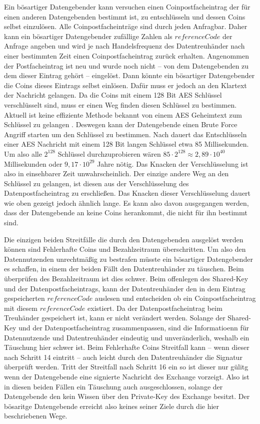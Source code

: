 \documentclass[
	fontsize=12pt,
	headings=small,
	parskip=half,           %
	bibliography=totoc,
	numbers=noenddot,       %
	open=any,               %
]{scrreprt}
\begin{document}
Ein bösartiger Datengebender kann versuchen einen Coinpostfacheintrag der für einen anderen Datengebenden bestimmt ist, zu entschlüsseln und dessen Coins selbst einzulösen. Alle Coinpostfacheinträge sind durch jeden Anfragbar. Daher kann ein bösartiger Datengebender zufällige Zahlen als $referenceCode$ der Anfrage angeben und wird je nach Handelsfrequenz des Datentreuhänder nach einer bestimmten Zeit einen Coinpostfacheintrag zurück erhalten. Angenommen der Postfacheintrag ist neu und wurde noch nicht -- von dem Datengebenden zu dem dieser Eintrag gehört -- eingelöst. Dann könnte ein bösartiger Datengebender die Coins dieses Eintrags selbst einlösen. Dafür muss er jedoch an den Klartext der Nachricht gelangen. Da die Coins mit einem 128 Bit AES Schlüssel verschlüsselt sind, muss er einen Weg finden diesen Schlüssel zu bestimmen. Aktuell ist keine effiziente Methode bekannt von einem AES Geheimtext zum  Schlüssel zu gelangen . Deswegen kann der Datengebende einen Brute Force Angriff starten um den Schlüssel zu bestimmen. Nach \cite{aes-Kumar2016Implementation} dauert das Entschlüsseln einer AES Nachricht mit einem 128 Bit langen Schlüssel etwa 85 Millisekunden. Um also alle $2^{128}$ Schlüssel durchzuprobieren wären $85\cdot 2^{128} \approx 2,89\cdot10^{40}$ Millisekunden oder $9,17\cdot10^{29}$ Jahre nötig. Das Knacken der Verschlüsselung ist also in einsehbarer Zeit unwahrscheinlich. Der einzige andere Weg an den Schlüssel zu gelangen, ist diesen aus der Verschlüsselung des Datenpostfacheintrag zu erschließen. Das Knacken dieser Verschlüsselung dauert wie oben gezeigt jedoch ähnlich lange. Es kann also davon ausgegangen werden, dass der Datengebende an keine Coins herankommt, die nicht für ihn bestimmt sind. 

Die einzigen beiden Streitfälle die durch den Datengebenden ausgelöst werden können sind Fehlerhafte Coins und Bezahlzeitraum überschritten. Um also den Datennutzenden unrechtmäßig zu bestrafen müsste ein bösartiger Datengebender es schaffen, in einem der beiden Fällt den Datentreuhänder zu täuschen. Beim überprüfen des Bezahlzeitraum ist dies schwer. Beim offenlegen des Shared-Key und der Datenpostfacheintrags, kann der Datentreuhänder den in dem Eintrag gespeicherten $referenceCode$ auslesen und entscheiden ob ein Coinpostfacheintrag mit diesem $referenceCode$ existiert. Da der Datenpostfacheintrag beim Treuhänder gespeichert ist, kann er nicht verändert werden. Solange der Shared-Key und der Datenpostfacheintrag zusammenpassen, sind die Informatioenn für Datennutzende und Datentreuhänder eindeutig und unveränderlich, weshalb ein Täuschung hier schwer ist. Beim Fehlerhafte Coins Streitfall kann -- wenn dieser nach Schritt 14 eintritt -- auch leicht durch den Datentreuhänder die Signatur überprüft werden. Tritt der Streitfall nach Schritt 16 ein so ist dieser nur gülitg wenn der Datengebende eine signierte Nachricht des Exchange vorzeigt. Also ist in diesen beiden Fällen ein Täuschung auch ausgeschlossen, solange der Datengebende den kein Wissen über den Private-Key des Exchange besitzt. Der bösaritge Datengebende erreicht also keines seiner Ziele durch die hier beschriebenen Wege.
\end{document}
